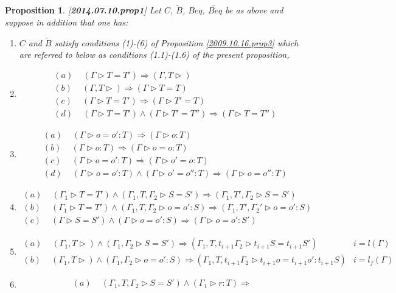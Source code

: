 \documentclass[11pt]{article}
\newtheorem{proposition}{Proposition}[subsection]
\newcommand{\llabel}[1]{\label{#1}[{\bf #1}]}
\newcommand{\wt}{\widetilde}
\newcommand{\spc}{{\,\,\,\,\,\,\,}}
\newcommand{\impl}{{\Rightarrow}}
\begin{document}
\begin{proposition}
\llabel{2014.07.10.prop1}
%
Let $C$, $\wt{B}$, $Beq$, $\wt{Beq}$ be as above and suppose in addition that one has:
%
\begin{enumerate}
\item $C$ and $\wt{B}$ satisfy conditions (1)-(6) of Proposition \ref{2009.10.16.prop3} which are referred to below as conditions (1.1)-(1.6) of the present proposition,
%
\item 
%
$$
\begin{array}{l}
(a)\spc(\Gamma\rhd T=T')\impl (\Gamma,T\rhd)\\
(b)\spc(\Gamma,T\rhd)\impl (\Gamma\rhd T=T)\\
(c )\spc(\Gamma\rhd T=T')\impl(\Gamma\rhd T'=T)\\
(d)\spc(\Gamma\rhd T=T')\wedge(\Gamma\rhd T'=T'')\impl(\Gamma\rhd T=T'')
\end{array}
$$
%
\item 
%
$$
\begin{array}{l}
(a)\spc(\Gamma\rhd o=o':T)\impl (\Gamma\rhd o:T)\\
(b)\spc(\Gamma\rhd o:T)\impl (\Gamma\rhd o=o:T)\\
(c )\spc(\Gamma\rhd o=o':T)\impl(\Gamma\rhd o'=o:T)\\
(d)\spc (\Gamma\rhd o=o':T)\wedge(\Gamma\rhd o'=o'':T)\impl(\Gamma\rhd o=o'':T)
\end{array}
$$
%
\item 
%
$$
\begin{array}{l}
(a)\spc (\Gamma_1\rhd T=T')\wedge(\Gamma_1,T,\Gamma_2\rhd S=S')\impl(\Gamma_1,T',\Gamma_2\rhd S=S')\\
(b)\spc (\Gamma_1\rhd T=T')\wedge(\Gamma_1,T,\Gamma_2\rhd o=o':S)\impl(\Gamma_1,T',\Gamma_2'\rhd o=o':S)\\
(c )\spc (\Gamma\rhd S=S')\wedge(\Gamma\rhd o=o':S)\impl(\Gamma\rhd o=o':S')
\end{array}
$$
%
\item 
%
$$
\begin{array}{ll}
(a)\spc (\Gamma_1,T\rhd)\wedge(\Gamma_1,\Gamma_2\rhd S=S')\impl(\Gamma_1,T,t_{i+1}\Gamma_2\rhd t_{i+1}S=t_{i+1}S')& i=l(\Gamma)\\
(b)\spc (\Gamma_1,T\rhd)\wedge(\Gamma_1,\Gamma_2\rhd o=o':S)\impl(\Gamma_1,T,t_{i+1}\Gamma_2\rhd t_{i+1}o=t_{i+1}o':t_{i+1}S)& i=l_f(\Gamma)
\end{array}
$$
%
\item
%
$$
\begin{array}{ll}
(a)\spc (\Gamma_1,T,\Gamma_2\rhd S=S')\wedge(\Gamma_1\rhd r:T)\impl&\\

\end{array}$$
\end{enumerate}
\end{proposition}
\end{document}
